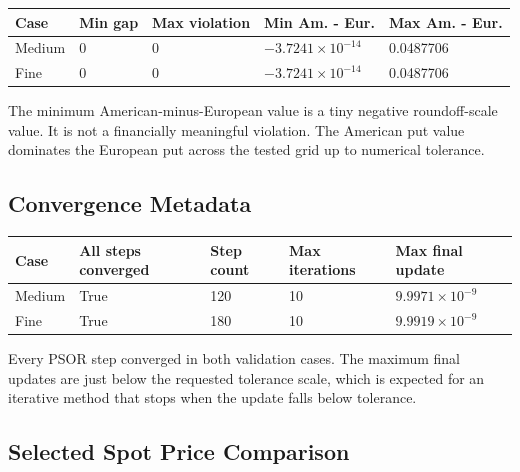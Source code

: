 \documentclass[11pt,a4paper]{article}
\begin{document}
{\small
\begin{longtable}{@{}L{0.13\textwidth}L{0.14\textwidth}L{0.16\textwidth}L{0.19\textwidth}L{0.19\textwidth}@{}}
\toprule
Case & Min gap & Max violation & Min Am. - Eur. & Max Am. - Eur. \\
\midrule
\endhead
Medium & 0 & 0 & \(-3.7241\times10^{-14}\) & 0.0487706 \\
Fine & 0 & 0 & \(-3.7241\times10^{-14}\) & 0.0487706 \\
\bottomrule
\end{longtable}
}

The minimum American-minus-European value is a tiny negative roundoff-scale value. It is not a
financially meaningful violation. The American put value dominates the European put across the
tested grid up to numerical tolerance.

\subsection{Convergence Metadata}

\begin{longtable}{@{}L{0.14\textwidth}L{0.18\textwidth}L{0.15\textwidth}L{0.18\textwidth}L{0.22\textwidth}@{}}
\toprule
Case & All steps converged & Step count & Max iterations & Max final update \\
\midrule
\endhead
Medium & True & 120 & 10 & \(9.9971\times10^{-9}\) \\
Fine & True & 180 & 10 & \(9.9919\times10^{-9}\) \\
\bottomrule
\end{longtable}

Every PSOR step converged in both validation cases. The maximum final updates are just below the
requested tolerance scale, which is expected for an iterative method that stops when the update
falls below tolerance.

\subsection{Selected Spot Price Comparison}
\end{document}

